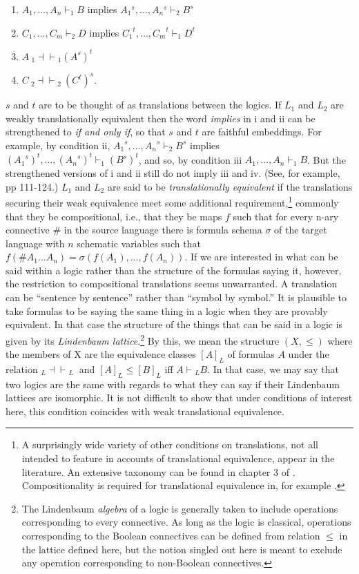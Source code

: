 \begin{enumerate} [label=(\roman*)]
\setlength\itemsep{.2 pt}
\item{$A_1,{\ldots},A_n \vdash_1 B$ implies ${A_1}\!^s,{\ldots},{A_n}\!^s \vdash_2 B^s$}
\item{$C_1,{\ldots},C_m \vdash_2 D$ implies ${C_1}^t,{\ldots},{C_m}^t \vdash_1 D^t$}
\item{$A ~_1\!{\dashv}{\vdash}\!_1 (A^s)^t$}
\item{$C ~_2\!{\dashv}{\vdash}\!_2 ~ (C^t)^s$.}
\end{enumerate}
$s$ and $t$ are to be thought of as translations between the logics. If $L_1$ and $L_2$ are weakly translationally equivalent then the word \textit{implies} in i and ii can be strengthened to \textit{if and only if}, so that $s$ and $t$ are faithful embeddings. For example, by condition ii, ${A_1}^s,{\ldots},{A_n}^s \vdash_2 B^s$ implies $({A_1}^s)^t,{\ldots},({A_n}^s)^t \vdash_1({B^s})^t$, and so, by condition iii $A_1,{\ldots},A_n \vdash_1 B$. But the strengthened versions of i and ii still do not imply iii and iv. (See, for example, \citet{French2010} pp 111-124.) $L_1$ and $L_2$ are said to be \textit{translationally equivalent} if the translations securing their weak equivalence meet some additional requirement,\footnote{A surprisingly wide variety of other conditions on translations, not all intended to feature in accounts of translational equivalence, appear in the literature. An extensive taxonomy can be found in chapter 3 of \citet{French2010}. Compositionality is required for translational equivalence in, for example \citet{PelletierAndUrquhart}.} commonly that they be compositional, i.e., that they be maps $f$ such that for every n-ary connective $\#$ in the source language there is formula schema $\sigma$ of the target language with $n$ schematic variables such that $f(\#A_1{\ldots}A_n)=\sigma(f(A_1),{\ldots},f(A_n))$. If we are interested in what can be said within a logic rather than the structure of the formulas saying it, however, the restriction to compositional translations seems unwarranted. A translation can be ``sentence by sentence'' rather than ``symbol by symbol.'' It is plausible to take formulas to be saying the same thing in a logic when they are provably equivalent. In that case the structure of the things that can be said in a logic is given by its \textit{Lindenbaum lattice}.\footnote{The Lindenbaum \textit{algebra} of a logic is generally taken to include operations corresponding to every connective. As long as the logic is classical, operations corresponding to the Boolean connectives can be defined from relation $\le$ in the lattice defined here, but the notion singled out here is meant to exclude any operation corresponding to non-Boolean connectives.} By this, we mean the structure $(X,\le )$ where the members of X are the equivalence classes $[A]_L$ of formulas $A$ under the relation $ _L\!{\dashv}{\vdash}\!_L~$ and $[A]_L\le [B]_L$ iff $A\vdash \!_LB$. In that case, we may say that two logics are the same with regards to what they can say if their Lindenbaum lattices are isomorphic. It is not difficult to show that under conditions of interest here, this condition coincides with weak translational equivalence.
